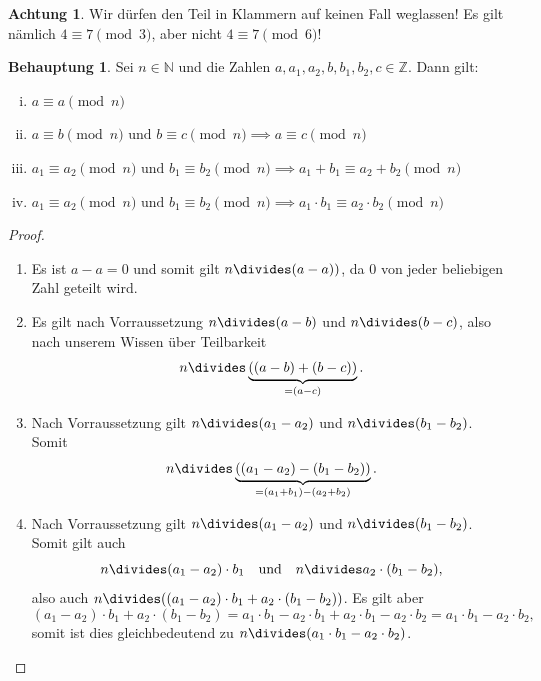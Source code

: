 \documentclass[a4paper,ngerman,12pt]{scrartcl}
\newcommand{\N}{\mathbb{N}}
\newcommand{\Z}{\mathbb{Z}}
\theoremstyle{definition}
\newtheorem{satz}{Behauptung}
\newtheorem*{acht}{Achtung}
\newenvironment{satzliste}{\begin{enumerate}[(i)]}{\end{enumerate}}
\newenvironment{beweisliste}{\begin{enumerate}[Zu (i):]}{\end{enumerate}}
\begin{document}
\begin{acht}
  Wir dürfen den Teil in Klammern auf keinen Fall weglassen! Es gilt nämlich
  $4 \equiv 7 \pmod{3}$, aber nicht $4 \equiv 7 \pmod{6}$!
\end{acht}

\begin{satz}
  Sei $n \in \N$ und die Zahlen $a, a_1, a_2, b, b_1, b_2, c \in \Z$. Dann gilt:
  \begin{satzliste}
    \item $a \equiv a \pmod{n}$
    \item $a \equiv b \pmod{n} \text{ und } b \equiv c \pmod{n} \implies a \equiv c \pmod{n}$
    \item $a_1 \equiv a_2 \pmod{n} \text{ und } b_1 \equiv b_2 \pmod{n} \implies a_1 + b_1 \equiv a_2 + b_2 \pmod{n}$
    \item $a_1 \equiv a_2 \pmod{n} \text{ und } b_1 \equiv b_2 \pmod{n} \implies a_1 \cdot b_1 \equiv a_2 \cdot b_2 \pmod{n}$
  \end{satzliste}
\end{satz}

\begin{proof}
  \begin{beweisliste}
    \item Es ist $a - a = 0$ und somit gilt $n \divides (a - a))$, da $0$ von jeder beliebigen Zahl geteilt wird.
    \item Es gilt nach Vorraussetzung $n \divides (a-b)$ und $n \divides (b-c)$, also nach unserem Wissen über Teilbarkeit
    \[ n \divides \underbrace{\left((a-b) + (b-c)\right)}_{= (a - c)}. \]
    \item Nach Vorraussetzung gilt $n \divides (a_1 - a_2)$ und $n \divides (b_1 - b_2)$. Somit
    \[ n \divides \underbrace{\left((a_1 - a_2) - (b_1 - b_2)\right)}_{= (a_1 + b_1) - (a_2 + b_2)}. \]
    \item Nach Vorraussetzung gilt $n \divides (a_1 - a_2)$ und $n \divides (b_1 - b_2)$. Somit gilt auch
    \[ n \divides (a_1 - a_2) \cdot b_1 \quad \text{und} \quad n \divides a_2 \cdot (b_1 - b_2), \]
    also auch $n \divides ((a_1 - a_2) \cdot b_1 + a_2 \cdot (b_1 - b_2))$. Es gilt aber
    \[ (a_1 - a_2) \cdot b_1 + a_2 \cdot (b_1 - b_2) = a_1 \cdot b_1 - a_2 \cdot b_1 + a_2 \cdot b_1 - a_2 \cdot b_2 = a_1 \cdot b_1 - a_2 \cdot b_2, \]
    somit ist dies gleichbedeutend zu $n \divides (a_1 \cdot b_1 - a_2 \cdot b_2)$.
  \end{beweisliste}
\end{proof}
\end{document}
